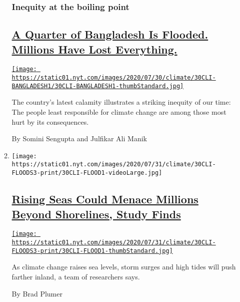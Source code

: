 \begin{enumerate}
\begin{enumerate}
    \hypertarget{inequity-at-the-boiling-point}{%
    \subsubsection{Inequity at the boiling
    point}\label{inequity-at-the-boiling-point}}

    \hypertarget{a-quarter-of-bangladesh-is-flooded-millions-have-lost-everything}{%
    \subsection{\texorpdfstring{\href{/2020/07/30/climate/bangladesh-floods.html}{A
    Quarter of Bangladesh Is Flooded. Millions Have Lost
    Everything.}}{A Quarter of Bangladesh Is Flooded. Millions Have Lost Everything.}}\label{a-quarter-of-bangladesh-is-flooded-millions-have-lost-everything}}

    \href{/2020/07/30/climate/bangladesh-floods.html}{\texttt{[image: https://static01.nyt.com/images/2020/07/30/climate/30CLI-BANGLADESH1/30CLI-BANGLADESH1-thumbStandard.jpg]}}

    The country's latest calamity illustrates a striking inequity of our
    time: The people least responsible for climate change are among
    those most hurt by its consequences.

    By Somini Sengupta and Julfikar Ali Manik
  \item
    \texttt{[image: https://static01.nyt.com/images/2020/07/31/climate/30CLI-FLOODS3-print/30CLI-FLOOD1-videoLarge.jpg]}

    \hypertarget{rising-seas-could-menace-millions-beyond-shorelines-study-finds}{%
    \subsection{\texorpdfstring{\href{/2020/07/30/climate/sea-level-inland-floods.html}{Rising
    Seas Could Menace Millions Beyond Shorelines, Study
    Finds}}{Rising Seas Could Menace Millions Beyond Shorelines, Study Finds}}\label{rising-seas-could-menace-millions-beyond-shorelines-study-finds}}

    \href{/2020/07/30/climate/sea-level-inland-floods.html}{\texttt{[image: https://static01.nyt.com/images/2020/07/31/climate/30CLI-FLOODS3-print/30CLI-FLOOD1-thumbStandard.jpg]}}

    As climate change raises sea levels, storm surges and high tides
    will push farther inland, a team of researchers says.

    By Brad Plumer
  \end{enumerate}
\end{enumerate}

